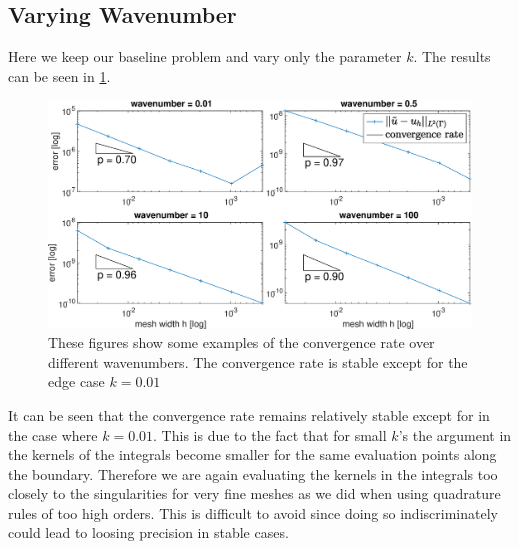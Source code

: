\documentclass[a4paper, oneside]{discothesis}
\begin{document}
\subsection{Varying Wavenumber}
Here we keep our baseline problem and vary only the parameter $k$.
The results can be seen in \ref{fig:wavenumber}.
\begin{figure} [!ht]
	\centering
	\includegraphics[width=\columnwidth]{figures/wavenumber.eps}
	\caption{ These figures show some examples of the convergence rate over different wavenumbers.
	The convergence rate is stable except for the edge case $k=0.01$}
	\label{fig:wavenumber}
\end{figure}
It can be seen that the convergence rate remains relatively stable except for in the case where $k=0.01$.
This is due to the fact that for small $k$'s the argument in the kernels of the integrals become smaller for the same evaluation points along the boundary.
Therefore we are again evaluating the kernels in the integrals too closely to the singularities for very fine meshes as we did when using quadrature rules of too high orders.
This is difficult to avoid since doing so indiscriminately could lead to loosing precision in stable cases.
\end{document}
